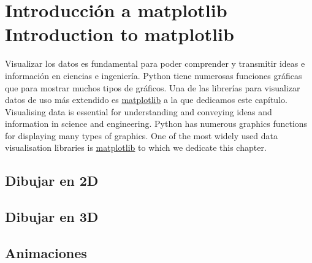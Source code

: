 \chapter{Introducción a matplotlib\\ Introduction to matplotlib}
\begin{paracol}{2}
    Visualizar los datos es fundamental para poder comprender y transmitir ideas e información en ciencias e ingeniería.
    Python tiene numerosas funciones gráficas que para mostrar muchos tipos de gráficos. Una de las librerías para visualizar datos de uso más extendido es \href{https://matplotlib.org/stable/}{matplotlib} a la que dedicamos este capítulo.
    \switchcolumn
    Visualising data is essential for understanding and conveying ideas and information in science and engineering.
    Python has numerous graphics functions for displaying many types of graphics. One of the most widely used data visualisation libraries is \href{https://matplotlib.org/stable/}{matplotlib} to which we dedicate this chapter.
\end{paracol}

\section{Dibujar en 2D}
\section{Dibujar en 3D}
\section{Animaciones}